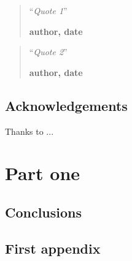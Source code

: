 \documentclass[11pt,a4paper,oneside]{book}
\begin{document}
\begin{quotation}
\noindent ``\emph{Quote 1}''
\begin{flushright}\textbf{author, date}\end{flushright}
\end{quotation}

\medskip

\begin{quotation}
\noindent ``\emph{Quote 2}''
\begin{flushright}\textbf{author, date}\end{flushright}
\end{quotation}


\chapter*{Acknowledgements}
\thispagestyle{empty} 

\noindent Thanks to ...


\thispagestyle{empty} 
\setcounter{page}{0}
\tableofcontents
\mainmatter 





\part{Part one}

\chapter{Conclusions}


\appendix
\chapter{First appendix}

\backmatter
\printindex %

 
\end{document}
